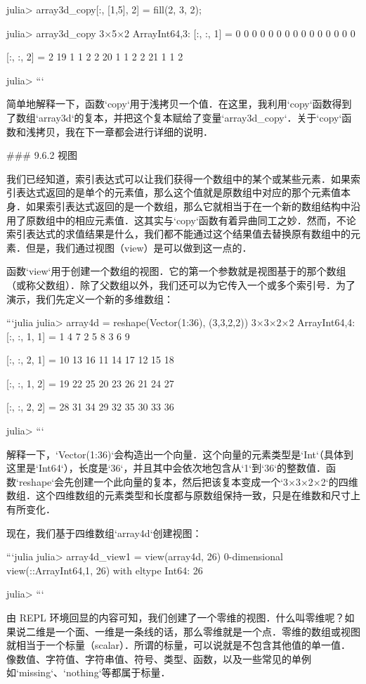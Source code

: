 julia> array3d_copy[:, [1,5], 2] = fill(2, 3, 2);

julia> array3d_copy
3×5×2 Array{Int64,3}:
[:, :, 1] =
 0  0  0  0  0
 0  0  0  0  0
 0  0  0  0  0

[:, :, 2] =
 2  19  1  1  2
 2  20  1  1  2
 2  21  1  1  2

julia> 
```

简单地解释一下，函数`copy`用于浅拷贝一个值．在这里，我利用`copy`函数得到了数组`array3d`的复本，并把这个复本赋给了变量`array3d_copy`．关于`copy`函数和浅拷贝，我在下一章都会进行详细的说明．

### 9.6.2 视图

我们已经知道，索引表达式可以让我们获得一个数组中的某个或某些元素．如果索引表达式返回的是单个的元素值，那么这个值就是原数组中对应的那个元素值本身．如果索引表达式返回的是一个数组，那么它就相当于在一个新的数组结构中沿用了原数组中的相应元素值．这其实与`copy`函数有着异曲同工之妙．然而，不论索引表达式的求值结果是什么，我们都不能通过这个结果值去替换原有数组中的元素．但是，我们通过视图（view）是可以做到这一点的．

函数`view`用于创建一个数组的视图．它的第一个参数就是视图基于的那个数组（或称父数组）．除了父数组以外，我们还可以为它传入一个或多个索引号．为了演示，我们先定义一个新的多维数组：

```julia
julia> array4d = reshape(Vector(1:36), (3,3,2,2))
3×3×2×2 Array{Int64,4}:
[:, :, 1, 1] =
 1  4  7
 2  5  8
 3  6  9

[:, :, 2, 1] =
 10  13  16
 11  14  17
 12  15  18

[:, :, 1, 2] =
 19  22  25
 20  23  26
 21  24  27

[:, :, 2, 2] =
 28  31  34
 29  32  35
 30  33  36

julia> 
```

解释一下，`Vector(1:36)`会构造出一个向量．这个向量的元素类型是`Int`（具体到这里是`Int64`），长度是`36`，并且其中会依次地包含从`1`到`36`的整数值．函数`reshape`会先创建一个此向量的复本，然后把该复本变成一个`3×3×2×2`的四维数组．这个四维数组的元素类型和长度都与原数组保持一致，只是在维数和尺寸上有所变化．

现在，我们基于四维数组`array4d`创建视图：

```julia
julia> array4d_view1 = view(array4d, 26)
0-dimensional view(::Array{Int64,1}, 26) with eltype Int64:
26

julia> 
```

由 REPL 环境回显的内容可知，我们创建了一个零维的视图．什么叫零维呢？如果说二维是一个面、一维是一条线的话，那么零维就是一个点．零维的数组或视图就相当于一个标量（scalar）．所谓的标量，可以说就是不包含其他值的单一值．像数值、字符值、字符串值、符号、类型、函数，以及一些常见的单例如`missing`、`nothing`等都属于标量．

